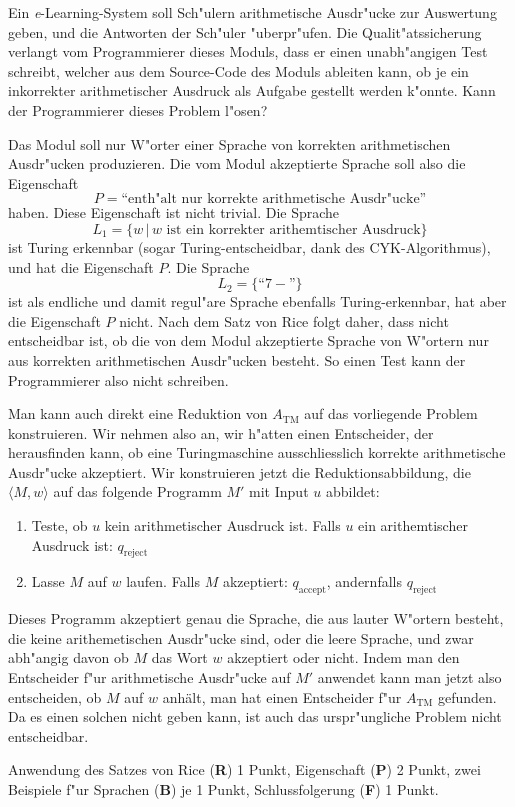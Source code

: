 Ein {\it e}-Learning-System soll Sch"ulern arithmetische Ausdr"ucke
zur Auswertung geben, und die Antworten der Sch"uler "uberpr"ufen.
Die Qualit"atssicherung verlangt vom Programmierer dieses Moduls, dass
er einen unabh"angigen Test schreibt, welcher aus dem Source-Code
des Moduls ableiten kann, ob je ein inkorrekter arithmetischer Ausdruck
als Aufgabe gestellt werden k"onnte. Kann der Programmierer dieses
Problem l"osen?

\begin{loesung}
Das Modul soll nur W"orter einer Sprache von korrekten arithmetischen
Ausdr"ucken produzieren.
Die vom Modul akzeptierte Sprache soll also die Eigenschaft
\[
P=\text{``enth"alt nur korrekte arithmetische Ausdr"ucke''}
\]
haben. 
Diese Eigenschaft ist nicht trivial. Die Sprache
\[
L_1=\{w\,|\,\text{$w$ ist ein korrekter arithemtischer Ausdruck}\}
\]
ist Turing erkennbar (sogar Turing-entscheidbar, dank des CYK-Algorithmus),
und hat die Eigenschaft $P$.
Die Sprache
\[
L_2=\{ \text{``$7-$''}\}
\]
ist als endliche und damit regul"are Sprache ebenfalls Turing-erkennbar,
hat aber die Eigenschaft $P$ nicht. Nach dem Satz von Rice folgt daher,
dass nicht entscheidbar ist, ob die von dem Modul akzeptierte Sprache
von W"ortern nur aus korrekten arithmetischen Ausdr"ucken besteht.
So einen Test kann der Programmierer also nicht schreiben.
\end{loesung}

\begin{loesung}
Man kann auch direkt eine Reduktion von $A_{\text{TM}}$ auf das vorliegende
Problem konstruieren.  Wir nehmen also an, wir h"atten einen Entscheider,
der herausfinden kann, ob eine Turingmaschine ausschliesslich korrekte
arithmetische Ausdr"ucke akzeptiert. Wir konstruieren jetzt die
Reduktionsabbildung, die $\langle M,w\rangle$ auf das folgende
Programm $M'$ mit Input $u$ abbildet:
\begin{enumerate}
\item Teste, ob $u$ kein arithmetischer Ausdruck ist. Falls 
$u$ ein arithemtischer Ausdruck ist: $q_\text{reject}$
\item Lasse $M$ auf $w$ laufen. Falls $M$ akzeptiert: $q_\text{accept}$,
andernfalls $q_\text{reject}$
\end{enumerate}
Dieses Programm akzeptiert genau die Sprache, die aus lauter W"ortern
besteht, die keine arithemetischen Ausdr"ucke sind, oder die leere
Sprache, und zwar abh"angig davon ob $M$ das Wort $w$ akzeptiert
oder nicht. Indem man den Entscheider f"ur arithmetische Ausdr"ucke
auf $M'$ anwendet kann man jetzt also entscheiden, ob $M$ auf $w$
anhält, man hat einen Entscheider f"ur $A_\text{TM}$ gefunden.
Da es einen solchen nicht geben kann, ist auch das urspr"ungliche
Problem nicht entscheidbar.
\end{loesung}

\begin{bewertung}
Anwendung des Satzes von Rice ({\bf R}) 1 Punkt,
Eigenschaft ({\bf P}) 2 Punkt,
zwei Beispiele f"ur Sprachen ({\bf B}) je 1 Punkt,
Schlussfolgerung ({\bf F}) 1 Punkt.
\end{bewertung}

